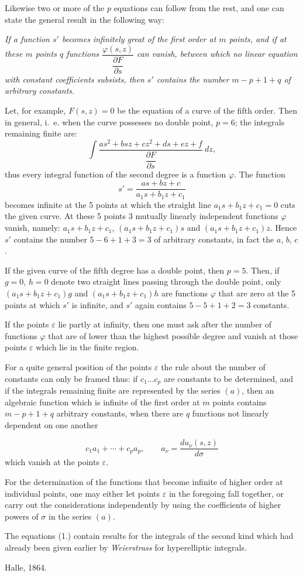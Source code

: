 \documentclass{article}
\begin{document}
Likewise two or more of the $p$ equations can follow from the rest, and one can state the general result in the following way:

\emph{If a function $s'$ becomes infinitely great of the first order at $m$ points, and if at these $m$ points $q$ functions $\dfrac{\varphi(s, z)}{\dfrac{\partial F}{\partial s}}$ can vanish, between which no linear equation with constant coefficients subsists, then $s'$ contains the number $m-p+1+q$ of arbitrary constants.}

Let, for example, $F(s, z) = 0$ be the equation of a curve of the fifth order. Then in general, i.~e. when the curve possesses no double point, $p = 6$; the integrals remaining finite are:
\[ \int \frac{as^{2} + bsz + cz^{2} + ds + ez + f}{\dfrac{\partial F}{\partial s}}\ dz, \]
thus every integral function of the second degree is a function $\varphi$. The function
\[ s' = \frac{as + bz + c}{a_{1}s + b_{1}z + c_{1}} \]
becomes infinite at the 5 points at which the straight line $a_{1}s + b_{1}z + c_{1} = 0$ cuts the given curve. At these 5 points 3 mutually linearly independent functions $\varphi$ vanish, namely: $a_{1}s + b_{1}z + c_{1}$, $(a_{1}s + b_{1}z + c_{1})s$ and $(a_{1}s + b_{1}z + c_{1})z$. Hence $s'$ contains the number $5 - 6 + 1 + 3 = 3$ of arbitrary constants, in fact the $a$, $b$, $c$.

If the given curve of the fifth degree has a double point, then $p = 5$. Then, if $g = 0$, $h = 0$ denote two straight lines passing through the double point, only $(a_{1}s + b_{1}z + c_{1})g$ and $(a_{1}s + b_{1}z + c_{1})h$ are functions $\varphi$ that are zero at the 5 points at which $s'$ is infinite, and $s'$ again contains $5 - 5 + 1 + 2 = 3$ constants.

If the points $\varepsilon$ lie partly at infinity, then one must ask after the number of functions $\varphi$ that are of lower than the highest possible degree and vanish at those points $\varepsilon$ which lie in the finite region.

For a quite general position of the points $\varepsilon$ the rule about the number of constants can only be framed thus: if $c_{1} \ldots c_{p}$ are constants to be determined, and if the integrals remaining finite are represented by the series $(a)$, then an algebraic function which is infinite of the first order at $m$ points contains $m-p+1+q$ arbitrary constants, when there are $q$ functions not linearly dependent on one another

\[ c_{1} a_{1} + \cdots + c_{p} a_{p}, \qquad a_{\nu} = \frac{du_{\nu}(s, z)}{d\sigma} \]
which vanish at the points $\varepsilon$.

For the determination of the functions that become infinite of higher order at individual points, one may either let points $\varepsilon$ in the foregoing fall together, or carry out the considerations independently by using the coefficients of higher powers of $\sigma$ in the series $(a)$.

The equations (1.) contain results for the  integrals of the second kind which had already been given earlier by \emph{Weierstrass} for hyperelliptic integrals.

Halle, 1864.
\end{document}
